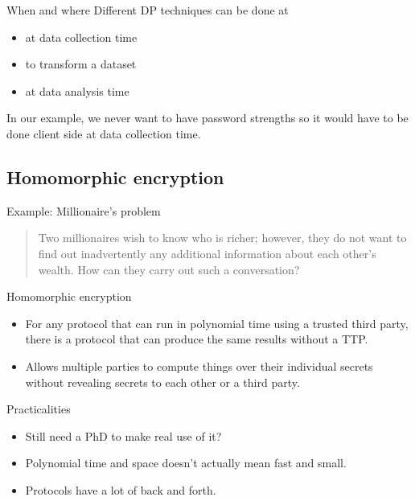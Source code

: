 \documentclass[xcolor={dvipsnames,table,hyperref}]{beamer}
\begin{document}
\begin{frame}{When and where}
  Different DP techniques can be done at
  \begin{itemize}
    \item at data collection time
    \item to transform a dataset
    \item at data analysis time
  \end{itemize}
  In our example, we never want to have password strengths so it would have to be done client side at data collection time.
\end{frame}

\subsection{Homomorphic encryption}

\begin{frame}{Example: Millionaire's problem}
  \blockcquote{yao1982protocols}{Two millionaires wish to know who is richer;
    however, they do not want to find out inadvertently any additional information about each other’s wealth. How can they carry out such a conversation?}
\end{frame}


\begin{frame}{Homomorphic encryption}
  \begin{itemize}
    \item For any protocol that can run in polynomial time using a trusted third party, there is a protocol that can produce the same results without a TTP\@.
    \item Allows multiple parties to compute things over their individual secrets without revealing secrets to each other or a third party.
  \end{itemize}
\end{frame}

\begin{frame}{Practicalities}
  \begin{itemize}
    \item Still need a PhD to make real use of it?
    \item Polynomial time and space doesn't actually mean fast and small.
    \item Protocols have a lot of back and forth.
  \end{itemize}
\end{frame}
\end{document}
